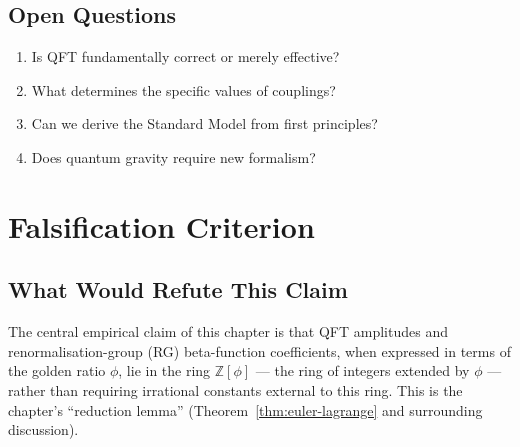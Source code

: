 \subsection*{Open Questions}

\begin{enumerate}
\item Is QFT fundamentally correct or merely effective?
\item What determines the specific values of couplings?
\item Can we derive the Standard Model from first principles?
\item Does quantum gravity require new formalism?
\end{enumerate}



\section{Falsification Criterion}\label{fa_21:sec:21-falsify}

\subsection{What Would Refute This Claim}

The central empirical claim of this chapter is that QFT amplitudes and
renormalisation-group (RG) beta-function coefficients, when expressed
in terms of the golden ratio $\phi$, lie in the ring
$\mathbb{Z}[\phi]$ — the ring of integers extended by $\phi$ — rather
than requiring irrational constants external to this ring.  This is
the chapter's ``reduction lemma'' (Theorem~\ref{thm:euler-lagrange}
and surrounding discussion).

